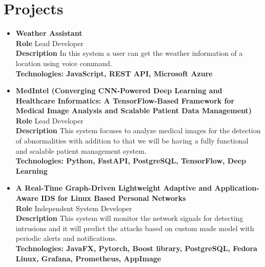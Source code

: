 \documentclass[a4paper,11pt]{article}
\begin{document}
\section*{\textbf{Projects}}
\begin{itemize}[leftmargin=*]

   \item \textbf{Weather Assistant}  \\
    	  \textbf{Role} Lead Developer	\\
          \textbf{Description} In this system a user can get the weather information of a location using voice command. \\
          \textbf{Technologies: JavaScript, REST API, Microsoft Azure}

    \item \textbf{MedIntel (Converging CNN-Powered Deep Learning and Healthcare Informatics: A TensorFlow-Based Framework for Medical Image Analysis and Scalable Patient Data Management)}  \\
    	  \textbf{Role} Lead Developer	\\
          \textbf{Description} This system focuses to analyze medical images for the detection of abnormalities with addition to that we will be having a fully functional and scalable patient management system. \\
          \textbf{Technologies: Python, FastAPI, PostgreSQL, TensorFlow, Deep Learning}

    \item \textbf{A Real-Time Graph-Driven Lightweight Adaptive and Application-Aware IDS for Linux Based Personal Networks}  \\
    	  \textbf{Role} Independent System Developer	\\
          \textbf{Description} This system will monitor the network signals for detecting intrusions and it will predict the attacks based on custom made model with periodic alerts and notifications. \\
          \textbf{Technologies: JavaFX, Pytorch, Boost library, PostgreSQL, Fedora Linux, Grafana, Prometheus, AppImage}
          
\end{itemize}
\end{document}
